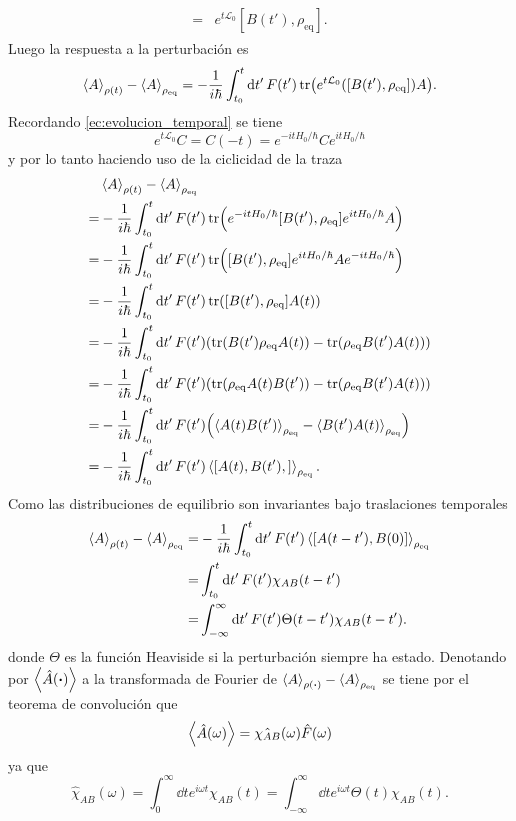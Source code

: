 \documentclass{article}
\begin{document}
\begin{enumerate}
\begin{align}
\begin{split}
=&e^{t\mathcal{L}_0}[B(t'),\rho_{\text{eq}}].
\end{split}
\end{align}
Luego la respuesta a la perturbación es 
\begin{equation}
\ev{A}_{\rho(t)}-\ev{A}_{\rho_\text{eq}}=-\frac{1}{i\hbar}\int_{t_0}^t\dd{t'}F(t')\tr(e^{t\mathcal{L}_0}([B(t'),\rho_{\text{eq}}])A).
\end{equation}
Recordando \eqref{ec:evolucion_temporal} se tiene
\begin{equation}
e^{t\mathcal{L}_0}C=C(-t)=e^{-itH_0/\hbar}Ce^{itH_0/\hbar}
\end{equation}
y por lo tanto haciendo uso de la ciclicidad de la traza
\begin{align}
\begin{split}
&\ev{A}_{\rho(t)}-\ev{A}_{\rho_\text{eq}}\\
=&-\frac{1}{i\hbar}\int_{t_0}^t\dd{t'}F(t')\tr(e^{-itH_0/\hbar}[B(t'),\rho_{\text{eq}}]e^{itH_0/\hbar}A)\\
=&-\frac{1}{i\hbar}\int_{t_0}^t\dd{t'}F(t')\tr([B(t'),\rho_{\text{eq}}]e^{itH_0/\hbar}Ae^{-itH_0/\hbar})\\
=&-\frac{1}{i\hbar}\int_{t_0}^t\dd{t'}F(t')\tr([B(t'),\rho_{\text{eq}}]A(t))\\
=&-\frac{1}{i\hbar}\int_{t_0}^t\dd{t'}F(t')\qty(\tr(B(t')\rho_{\text{eq}}A(t))-\tr(\rho_{\text{eq}}B(t')A(t)))\\
=&-\frac{1}{i\hbar}\int_{t_0}^t\dd{t'}F(t')\qty(\tr(\rho_{\text{eq}}A(t)B(t'))-\tr(\rho_{\text{eq}}B(t')A(t)))\\
=&-\frac{1}{i\hbar}\int_{t_0}^t\dd{t'}F(t')\qty(\ev{A(t)B(t')}_{\rho_{\text{eq}}}-\ev{B(t')A(t)}_{\rho_{\text{eq}}})\\
=&-\frac{1}{i\hbar}\int_{t_0}^t\dd{t'}F(t')\ev{[A(t),B(t'),]}_{\rho_{\text{eq}}}.
\end{split}
\end{align}
Como las distribuciones de equilibrio son invariantes bajo traslaciones temporales
\begin{align}
\begin{split}
\ev{A}_{\rho(t)}-\ev{A}_{\rho_\text{eq}}=&-\frac{1}{i\hbar}\int_{t_0}^t\dd{t'}F(t')\ev{[A(t-t'),B(0)]}_{\rho_{\text{eq}}}\\
=&\int_{t_0}^t\dd{t'}F(t')\chi_{AB}(t-t')\\
=&\int_{-\infty}^\infty\dd{t'}F(t')\Theta(t-t')\chi_{AB}(t-t').
\end{split}
\end{align}
donde $\Theta$ es la función Heaviside si la perturbación siempre ha estado. Denotando por $\ev{\hat{A}(\vdot)}$ a la transformada de Fourier de $\ev{A}_{\rho(\vdot)}-\ev{A}_{\rho_\text{eq}}$ se tiene por el teorema de convolución que
\begin{equation}
\ev{\hat{A}(\omega)}=\hat{\chi_{AB}}(\omega)\hat{F}(\omega)
\end{equation}
ya que
\begin{equation}
\hat{\chi}_{AB}(\omega)=\int_0^\infty\dd{t}e^{i\omega t}\chi_{AB}(t)=\int_{-\infty}^\infty\dd{t}e^{i\omega t}\Theta(t)\chi_{AB}(t).
\end{equation}


\end{enumerate}
\end{document}
